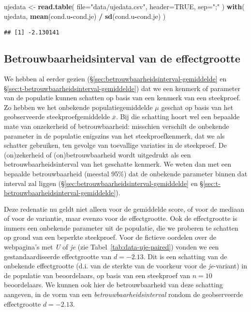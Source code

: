 \documentclass[
]{book}
\newenvironment{Shaded}{\begin{snugshade}}{\end{snugshade}}
\newcommand{\DataTypeTok}[1]{\textcolor[rgb]{0.13,0.29,0.53}{#1}}
\newcommand{\KeywordTok}[1]{\textcolor[rgb]{0.13,0.29,0.53}{\textbf{#1}}}
\newcommand{\NormalTok}[1]{#1}
\newcommand{\OperatorTok}[1]{\textcolor[rgb]{0.81,0.36,0.00}{\textbf{#1}}}
\newcommand{\OtherTok}[1]{\textcolor[rgb]{0.56,0.35,0.01}{#1}}
\newcommand{\StringTok}[1]{\textcolor[rgb]{0.31,0.60,0.02}{#1}}
\begin{document}
\begin{Shaded}
\begin{Highlighting}[]
\NormalTok{ujedata \textless{}{-}}\StringTok{ }\KeywordTok{read.table}\NormalTok{( }\DataTypeTok{file=}\StringTok{"data/ujedata.csv"}\NormalTok{, }\DataTypeTok{header=}\OtherTok{TRUE}\NormalTok{, }\DataTypeTok{sep=}\StringTok{";"}\NormalTok{ )}
\KeywordTok{with}\NormalTok{( ujedata, }\KeywordTok{mean}\NormalTok{(cond.u}\OperatorTok{{-}}\NormalTok{cond.je) }\OperatorTok{/}\StringTok{ }\KeywordTok{sd}\NormalTok{(cond.u}\OperatorTok{{-}}\NormalTok{cond.je) )}
\end{Highlighting}
\end{Shaded}

\begin{verbatim}
## [1] -2.130141
\end{verbatim}

\hypertarget{sec:betrouwbaarheidsinterval-effectgrootte}{%
\subsection{Betrouwbaarheidsinterval van de effectgrootte}\label{sec:betrouwbaarheidsinterval-effectgrootte}}

We hebben al eerder gezien
(§\ref{sec:betrouwbaarheidsinterval-gemiddelde} en §\ref{sec:t-betrouwbaarheidsinterval-gemiddelde})
dat we een kenmerk
of parameter van de populatie kunnen schatten op basis van een kenmerk
van een steekproef. Zo hebben we het onbekende populatiegemiddelde \(\mu\)
geschat op basis van het geobserveerde steekproefgemiddelde
\(\overline{x}\). Bij die schatting hoort wel een bepaalde mate van
onzekerheid of betrouwbaarheid: misschien verschilt de onbekende
parameter in de populatie enigszins van het steekproefkenmerk, dat we
als schatter gebruiken, ten gevolge van toevallige variaties in de
steekproef. De (on)zekerheid of (on)betrouwbaarheid wordt uitgedrukt als
een betrouwbaarheidsinterval van het geschatte kenmerk. We weten dan met
een bepaalde betrouwbaarheid (meestal 95\%) dat de onbekende parameter
binnen dat interval zal liggen
(§\ref{sec:betrouwbaarheidsinterval-gemiddelde} en §\ref{sec:t-betrouwbaarheidsinterval-gemiddelde}).

Deze redenatie nu geldt niet alleen voor de gemiddelde score, of voor de
mediaan of voor de variantie, maar evenzo voor de effectgrootte. Ook de
effectgrootte is immers een onbekende parameter uit de populatie, die we
proberen te schatten op grond van een beperkte steekproef. Voor de
fictieve oordelen over de webpagina's met \emph{U} of \emph{je} (zie
Tabel~\ref{tab:data-uje-paired}) vonden we een gestandaardiseerde
effectgrootte van \(d=-2.13\). Dit is een schatting van de onbekende
effectgrootte (d.i. van de sterkte van de voorkeur voor de \emph{je}-variant)
in de populatie van beoordelaars, op basis van een steekproef van \(n=10\)
beoordelaars. We kunnen ook hier de betrouwbaarheid van deze schatting
aangeven, in de vorm van een \emph{betrouwbaarheidsinterval} rondom de
geobserveerde effectgrootte \(d=-2.13\).
\end{document}
